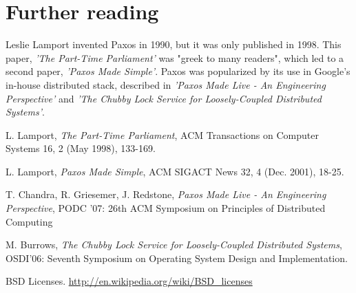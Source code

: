 \documentclass[12pt]{article}
\begin{document}
\section{ Further reading }

Leslie Lamport invented Paxos in 1990, but it was only published in 1998. This paper, \emph{'The Part-Time Parliament'} was "greek to many readers", which led to a second paper, \emph{'Paxos Made Simple'}. Paxos was popularized by its use in Google's in-house distributed stack, described in \emph{'Paxos Made Live - An Engineering Perspective'} and \emph{'The Chubby Lock Service for Loosely-Coupled Distributed Systems'}.

\begin{thebibliography}{9}

L. Lamport, \emph{The Part-Time Parliament}, ACM Transactions on Computer Systems 16, 2 (May 1998), 133-169.

L. Lamport, \emph{Paxos Made Simple}, ACM SIGACT News 32, 4 (Dec. 2001), 18-25.

T. Chandra, R. Griesemer, J. Redstone, \emph{Paxos Made Live - An Engineering Perspective}, PODC '07: 26th ACM Symposium on Principles of Distributed Computing

M. Burrows, \emph{The Chubby Lock Service for Loosely-Coupled Distributed Systems}, OSDI'06: Seventh Symposium on Operating System Design and Implementation.

BSD Licenses. \url{http://en.wikipedia.org/wiki/BSD_licenses}

\end{thebibliography}
\end{document}
